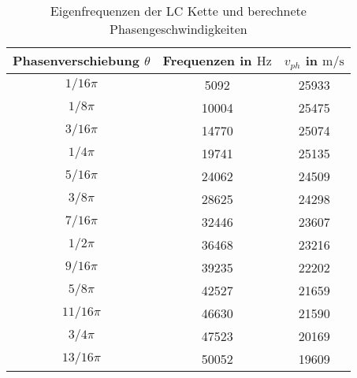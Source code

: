 \begin{table}
\centering
\caption{Eigenfrequenzen der LC Kette und berechnete Phasengeschwindigkeiten}
\label{tab: v_phase}
\begin{tabular}{S S S }
\toprule
{Phasenverschiebung $\theta$} & {Frequenzen in $\si{\hertz}$} & {$v_{ph}$ in $\si{\meter\per\second}$}  \\
\midrule
{${1}/{16}\pi$}  & 5092  & 25933\\
{${1}/{8}\pi$}  & 10004  & 25475\\
{${3}/{16}\pi$} & 14770  & 25074\\
{${1}/{4}\pi$}  & 19741  & 25135\\
{${5}/{16}\pi$}   & 24062  & 24509\\
{${3}/{8}\pi$}  & 28625  & 24298\\
{${7}/{16}\pi$} & 32446  & 23607\\
{${1}/{2}\pi$}  & 36468  & 23216\\
{${9}/{16}\pi$}  & 39235  & 22202\\
{${5}/{8}\pi$}  & 42527  & 21659\\
{${11}/{16}\pi$}  & 46630  & 21590\\
{${3}/{4}\pi$}  & 47523  & 20169\\
{${13}/{16}\pi$}  & 50052  & 19609\\ 
\bottomrule
\end{tabular}
\end{table}
